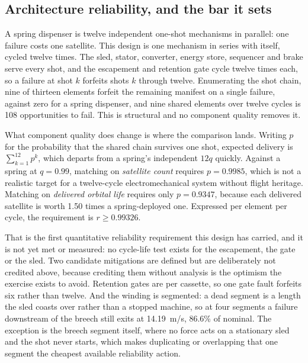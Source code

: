 \documentclass[conference]{IEEEtran}
\begin{document}
\subsection{Architecture reliability, and the bar it sets}
A spring dispenser is twelve independent one-shot mechanisms in parallel: one failure costs one satellite. This design is one mechanism in series with itself, cycled twelve times. The sled, stator, converter, energy store, sequencer and brake serve every shot, and the escapement and retention gate cycle twelve times each, so a failure at shot $k$ forfeits shots $k$ through twelve. Enumerating the shot chain, nine of thirteen elements forfeit the remaining manifest on a single failure, against zero for a spring dispenser, and nine shared elements over twelve cycles is 108 opportunities to fail. This is structural and no component quality removes it.

What component quality does change is where the comparison lands. Writing $p$ for the probability that the shared chain survives one shot, expected delivery is $\sum_{k=1}^{12}p^k$, which departs from a spring's independent $12q$ quickly. Against a spring at $q=0.99$, matching on \emph{satellite count} requires $p=0.9985$, which is not a realistic target for a twelve-cycle electromechanical system without flight heritage. Matching on \emph{delivered orbital life} requires only $p=0.9347$, because each delivered satellite is worth 1.50 times a spring-deployed one. Expressed per element per cycle, the requirement is $r\geq0.99326$.

That is the first quantitative reliability requirement this design has carried, and it is not yet met or measured: no cycle-life test exists for the escapement, the gate or the sled. Two candidate mitigations are defined but are deliberately not credited above, because crediting them without analysis is the optimism the exercise exists to avoid. Retention gates are per cassette, so one gate fault forfeits six rather than twelve. And the winding is segmented: a dead segment is a length the sled coasts over rather than a stopped machine, so at four segments a failure downstream of the breech still exits at 14.19~m/s, 86.6\% of nominal. The exception is the breech segment itself, where no force acts on a stationary sled and the shot never starts, which makes duplicating or overlapping that one segment the cheapest available reliability action.
\end{document}

